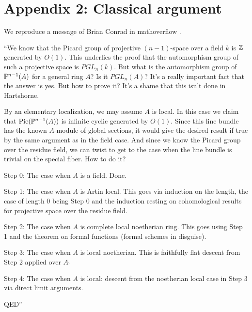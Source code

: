 \section*{Appendix 2: Classical argument}

We reproduce a message of Brian Conrad in mathoverflow \cite{conrad-mathoverflow-16324}.

\medskip

``We know that the Picard group of projective $(n-1)$-space over a field $k$ is $\mathbb{Z}$
generated by $O(1)$.
This underlies the proof that the automorphism group of such a projective space is $PGL_n(k)$.
But what is the automorphism group of $\mathbb{P}^{n-1}(A)$ for a general ring $A$? Is it $PGL_n(A)$?
It's a really important fact that the answer is yes.
But how to prove it? It's a shame that this isn't done in Hartshorne.

By an elementary localization, we may assume $A$ is local.
In this case we claim that $\mathrm{Pic}(\mathbb{P}^{n-1}(A))$ is infinite cyclic generated by $O(1)$.
Since this line bundle has the known $A$-module of global sections,
it would give the desired result if true by the same argument as in the field case.
And since we know the Picard group over the residue field, we can twist
to get to the case when the line bundle is trivial on the special fiber. How to do it?

\medskip

 Step 0: The case when $A$ is a field. Done.

 \medskip

 Step 1: The case when $A$ is Artin local.
 This goes via induction on the length, the case of length $0$ being Step $0$
 and the induction resting on cohomological results for projective space over the residue field.

  \medskip

 Step 2: The case when $A$ is complete local noetherian ring. This goes
 using Step 1 and the theorem on formal functions (formal schemes in disguise).

  \medskip

 Step 3: The case when $A$ is local noetherian.
 This is faithfully flat descent from Step 2 applied over $A~\widehat{}$

 \medskip
 
 Step 4: The case when $A$ is local:
 descent from the noetherian local case in Step 3 via direct limit arguments.

\medskip
 
QED''
